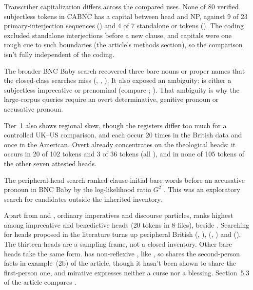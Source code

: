 \documentclass[12pt]{article}
\begin{document}
Transcriber capitalization differs across the compared uses. None of 80 verified subjectless tokens in CABNC has a capital between head and NP, against 9 of 23 primary-interjection sequences () and 4 of 7 standalone  or  tokens (). The coding excluded standalone interjections before a new clause, and capitals were one rough cue to such boundaries (the article's methods section), so the comparison isn't fully independent of the coding.

The broader BNC Baby search recovered three bare nouns or proper names that the closed-class searches miss (, , ). It also exposed an ambiguity:  is either a subjectless imprecative or prenominal  (compare ; \citealp[35 n.\ 29]{portner2026}). That ambiguity is why the large-corpus queries require an overt determinative, genitive pronoun or accusative pronoun.

Tier~1 also shows regional skew, though the registers differ too much for a controlled UK--US comparison.  and  each occur 20 times in the British data and once in the American. Overt  already concentrates on the theological heads: it occurs in 20 of 102  tokens and 3 of 36  tokens (all ), and in none of 105 tokens of the other seven attested heads.

The peripheral-head search ranked clause-initial bare words before an accusative pronoun in BNC Baby by the log-likelihood ratio $G^2$ \citep{dunning1993}. This was an exploratory search for candidates outside the inherited inventory.

Apart from  and , ordinary imperatives and discourse particles,  ranks highest among imprecative and benedictive heads (20 tokens in 8 files), beside . Searching for heads proposed in the literature turns up peripheral British  (, ),  (, ) and  (). The thirteen heads are a sampling frame, not a closed inventory. Other bare heads take the same form.  has non-reflexive , like , so  shares the second-person facts in example~(2b) of the article, though it hasn't been shown to share the first-person one, and mirative  expresses neither a curse nor a blessing. Section~5.3 of the article compares .
\end{document}
